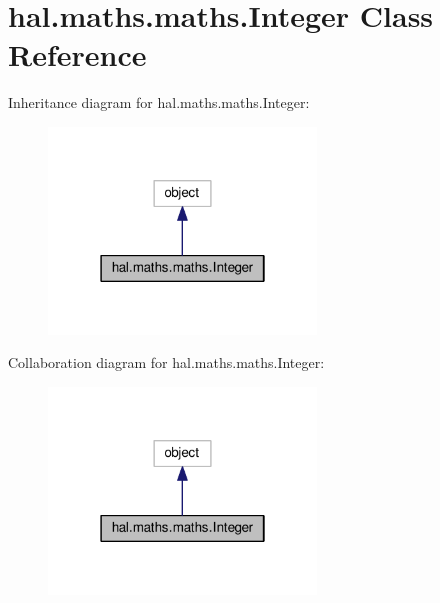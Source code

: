 \hypertarget{classhal_1_1maths_1_1maths_1_1_integer}{}\section{hal.\+maths.\+maths.\+Integer Class Reference}
\label{classhal_1_1maths_1_1maths_1_1_integer}


Inheritance diagram for hal.\+maths.\+maths.\+Integer\+:\nopagebreak
\begin{figure}[H]
\begin{center}
\leavevmode
\includegraphics[width=202pt]{classhal_1_1maths_1_1maths_1_1_integer__inherit__graph}
\end{center}
\end{figure}


Collaboration diagram for hal.\+maths.\+maths.\+Integer\+:\nopagebreak
\begin{figure}[H]
\begin{center}
\leavevmode
\includegraphics[width=202pt]{classhal_1_1maths_1_1maths_1_1_integer__coll__graph}
\end{center}
\end{figure}
